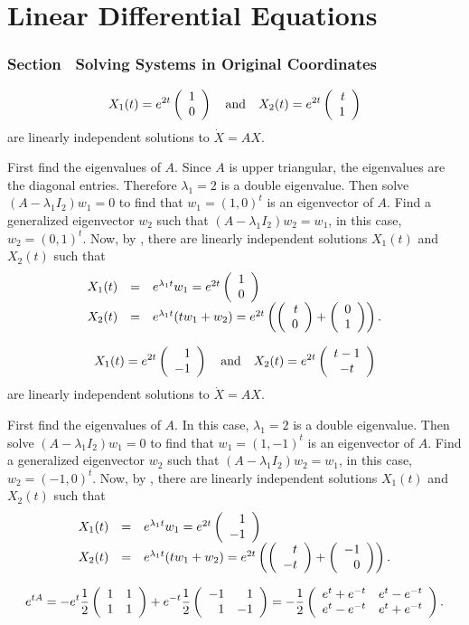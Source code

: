 \chapter{Linear Differential Equations}

\subsection*{Section~\protect{\ref{S:SEOC}} Solving Systems in Original Coordinates}

 \ans
\[
X_1(t) = e^{2t}\left(\begin{array}{r} 1 \\ 0\end{array}\right) \quad\mbox{and}\quad
X_2(t) = e^{2t}\left(\begin{array}{r} t \\ 1\end{array}\right)
\]
are linearly independent solutions to $\dot{X} = AX$.

\soln First find the eigenvalues of $A$.  Since $A$ is upper triangular,
the eigenvalues are the diagonal entries.  Therefore $\lambda_1 = 2$
is a double eigenvalue.  Then solve $(A - \lambda_1 I_2)w_1 = 0$ to
find that $w_1 = (1,0)^t$ is an eigenvector of $A$.  Find a
generalized eigenvector $w_2$ such that $(A - \lambda_1 I_2)w_2 =
w_1$, in this case, $w_2 = (0,1)^t$.  Now, by ,
there are linearly independent solutions $X_1(t)$ and $X_2(t)$ such that
\[
\begin{array}{rcl}
X_1(t) & = & e^{\lambda_1 t}w_1 = e^{2t}\left(\begin{array}{r} 1 \\ 0\end{array}\right) \\ X_2(t) & = &
e^{\lambda_1 t}(tw_1 + w_2) = e^{2t}\left(\left(\begin{array}{r} t \\ 0\end{array}\right) +
\left(\begin{array}{r} 0 \\ 1\end{array}\right)\right).
\end{array}
\]

 \ans
\[
X_1(t) = e^{2t}\left(\begin{array}{r} 1 \\ -1\end{array}\right) \quad\mbox{and}\quad
X_2(t) = e^{2t}\left(\begin{array}{c} t - 1 \\ -t\end{array}\right)
\]
are linearly independent solutions to $\dot{X} = AX$.

\soln First find the eigenvalues of $A$.  In this case, $\lambda_1 = 2$
is a double eigenvalue.  Then solve $(A - \lambda_1 I_2)w_1 = 0$ to
find that $w_1 = (1,-1)^t$ is an eigenvector of $A$.  Find a
generalized eigenvector $w_2$ such that $(A - \lambda_1 I_2)w_2 =
w_1$, in this case, $w_2 = (-1,0)^t$.  Now, by ,
there are linearly independent solutions $X_1(t)$ and $X_2(t)$ such that
\[
\begin{array}{rcl}
X_1(t) & = & e^{\lambda_1 t}w_1 = e^{2t}\left(\begin{array}{r} 1 \\ -1\end{array}\right) \\
X_2(t) & = & e^{\lambda_1 t}(tw_1 + w_2) = e^{2t}\left(\left(\begin{array}{r} t \\ -t\end{array}\right) +
\left(\begin{array}{r} -1 \\ 0\end{array}\right)\right).
\end{array}
\]

 \ans
\[
e^{tA} = -e^t\frac{1}{2}\left(\begin{array}{rr} 1 & 1\\ 1 &1\end{array}\right) +
e^{-t}\frac{1}{2}\left(\begin{array}{rr} -1 & 1\\ 1 &-1\end{array}\right)
= -\frac{1}{2}\left(\begin{array}{cc} e^{t} + e^{-t} & e^t - e^{-t}\\ e^t - e^{-t} &e^t + e^{-t}\end{array}\right).
\]

